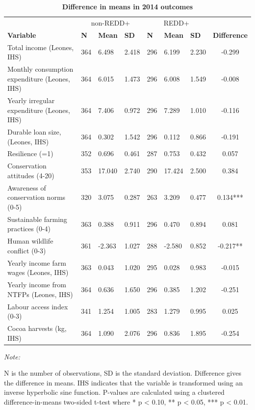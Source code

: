 \documentclass[
]{article}
\begin{document}
\begin{table}[!h]

\caption{\label{tab:tabSumstats}\textbf{Difference in means in 2014 outcomes}}
\centering
\begin{threeparttable}
\begin{tabular}[t]{lllllllc}
\toprule
\multicolumn{1}{c}{ } & \multicolumn{3}{c}{non-REDD+} & \multicolumn{3}{c}{REDD+} & \multicolumn{1}{c}{ } \\
\cmidrule(l{3pt}r{3pt}){2-4} \cmidrule(l{3pt}r{3pt}){5-7}
\textbf{Variable} & \textbf{N} & \textbf{Mean} & \textbf{SD} & \textbf{N} & \textbf{Mean} & \textbf{SD} & \textbf{Difference}\\
\midrule
Total income (Leones, IHS) & 364 & 6.498 & 2.418 & 296 & 6.199 & 2.230 & -0.299\\
Monthly consumption expenditure (Leones, IHS) & 364 & 6.015 & 1.473 & 296 & 6.008 & 1.549 & -0.008\\
Yearly irregular expenditure (Leones, IHS) & 364 & 7.406 & 0.972 & 296 & 7.289 & 1.010 & -0.116\\
Durable loan size, (Leones, IHS) & 364 & 0.302 & 1.542 & 296 & 0.112 & 0.866 & -0.191\\
Resilience (=1) & 352 & 0.696 & 0.461 & 287 & 0.753 & 0.432 & 0.057\\
Conservation attitudes (4-20) & 353 & 17.040 & 2.740 & 290 & 17.424 & 2.500 & 0.384\\
Awareness of conservation norms (0-5) & 320 & 3.075 & 0.287 & 263 & 3.209 & 0.477 & 0.134***\\
Sustainable farming practices (0-4) & 363 & 0.388 & 0.911 & 296 & 0.470 & 0.894 & 0.081\\
Human wildlife conflict (0-3) & 361 & -2.363 & 1.027 & 288 & -2.580 & 0.852 & -0.217**\\
Yearly income farm wages (Leones, IHS) & 363 & 0.043 & 1.020 & 295 & 0.028 & 0.983 & -0.015\\
Yearly income from NTFPs (Leones, IHS) & 364 & 0.636 & 1.650 & 296 & 0.385 & 1.202 & -0.251\\
Labour access index (0-3) & 341 & 1.254 & 1.005 & 283 & 1.279 & 0.995 & 0.025\\
Cocoa harvests (kg, IHS) & 364 & 1.090 & 2.076 & 296 & 0.836 & 1.895 & -0.254\\
\bottomrule
\end{tabular}
\begin{tablenotes}
\item \textit{Note: } 
\item N is the number of observations, SD is the standard deviation. Difference gives the difference in means. IHS indicates that the variable is transformed using an inverse hyperbolic sine function. P-values are calculated using a clustered difference-in-means two-sided t-test where * p < 0.10, ** p < 0.05, *** p < 0.01.
\end{tablenotes}
\end{threeparttable}
\end{table}
\end{document}
